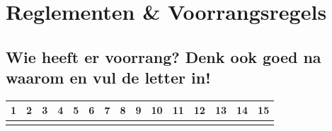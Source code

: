 \chapter{Reglementen \& Voorrangsregels}
\vspace{-120px}
\section*{Wie heeft er voorrang? Denk ook goed na waarom en vul de letter in!}
\begin{table}[h!]
\centering
\begin{tabular}{l|l|l|l|l|l|l|l|l|l|l|l|l|l|l}
\textbf{1} & \textbf{2} & \textbf{3} & \textbf{4} & \textbf{5} & \textbf{6} & \textbf{7} & \textbf{8} & \textbf{9} & \textbf{10} & \textbf{11} & \textbf{12} & \textbf{13} & \textbf{14} & \textbf{15} \\ \hline
 \hspace{0.5 cm} & \hspace{0.5 cm}  & \hspace{0.5 cm} & \hspace{0.5 cm} & \hspace{0.5 cm} & \hspace{0.5 cm} & \hspace{0.5 cm} & \hspace{0.5 cm} & \hspace{0.5 cm} & \hspace{0.5 cm} & \hspace{0.5 cm} & \hspace{0.5 cm} & \hspace{0.5 cm} & \hspace{0.5 cm}
\end{tabular}
\end{table}
